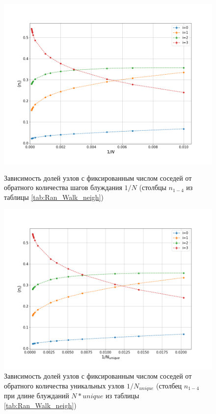 \begin{figure}[h]
    
\begin{minipage}{0.49\textwidth}
\centering
\includegraphics[width=\textwidth]{Sections/Images_2/Rand_Path_n_i.png}
\caption{Зависимость долей узлов с фиксированным числом соседей от обратного количества шагов блуждания $1/N$  (столбцы $n_{1-4}$ из таблицы \ref{tab:Ran_Walk_neigh})}
\label{fig:DS_n_i}
\end{minipage}
\hfill
\begin{minipage}{0.49\textwidth}
\centering
\includegraphics[width=\textwidth]{Sections/Images_2/Rand_Path_n_i_unique.png}
\caption{Зависимость долей узлов с фиксированным числом соседей от обратного количества уникальных узлов $1/N_{unique}$  (столбец $n_{1-4}$ при длине блужданий $N * unique$ из таблицы \ref{tab:Ran_Walk_neigh})}

\end{minipage}
\end{figure}
